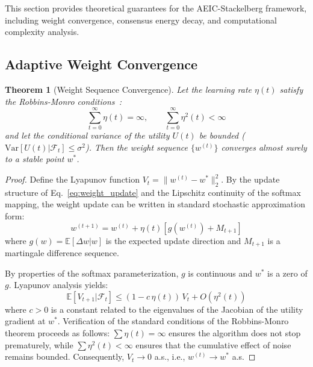 \documentclass[12pt,a4paper]{article}
\newtheorem{theorem}{Theorem}[section]
\begin{document}
This section provides theoretical guarantees for the AEIC-Stackelberg framework, including weight convergence, consensus energy decay, and computational complexity analysis.

\subsection{Adaptive Weight Convergence}

\begin{theorem}[Weight Sequence Convergence]\label{thm:convergence}
Let the learning rate $\eta(t)$ satisfy the Robbins-Monro conditions~\cite{robbins1951stochastic}:
\begin{equation}
\sum_{t=0}^\infty \eta(t) = \infty, \qquad \sum_{t=0}^\infty \eta^2(t) < \infty
\end{equation}
and let the conditional variance of the utility $U(t)$ be bounded ($\text{Var}[U(t) | \mathcal{F}_t] \leq \sigma^2$). Then the weight sequence $\{w^{(t)}\}$ converges almost surely to a stable point $w^*$.
\end{theorem}

\begin{proof}
Define the Lyapunov function $V_t = \|w^{(t)} - w^*\|_2^2$. By the update structure of Eq.~\eqref{eq:weight_update} and the Lipschitz continuity of the softmax mapping, the weight update can be written in standard stochastic approximation form:
\begin{equation}
w^{(t+1)} = w^{(t)} + \eta(t) \left[ g(w^{(t)}) + M_{t+1} \right]
\end{equation}
where $g(w) = \mathbb{E}[\Delta w | w]$ is the expected update direction and $M_{t+1}$ is a martingale difference sequence.

By properties of the softmax parameterization, $g$ is continuous and $w^*$ is a zero of $g$. Lyapunov analysis yields:
\begin{equation}
\mathbb{E}[V_{t+1} | \mathcal{F}_t] \leq (1 - c\,\eta(t))\,V_t + O(\eta^2(t))
\end{equation}
where $c > 0$ is a constant related to the eigenvalues of the Jacobian of the utility gradient at $w^*$. Verification of the standard conditions of the Robbins-Monro theorem proceeds as follows: $\sum \eta(t) = \infty$ ensures the algorithm does not stop prematurely, while $\sum \eta^2(t) < \infty$ ensures that the cumulative effect of noise remains bounded. Consequently, $V_t \to 0$ a.s., i.e., $w^{(t)} \to w^*$ a.s.
\end{proof}
\end{document}

